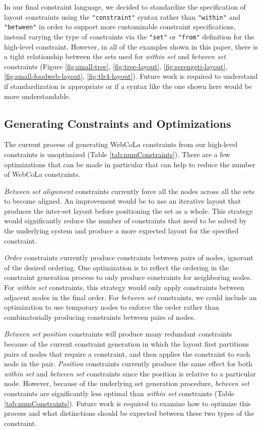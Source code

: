 In our final constraint language, we decided to standardize the specification of layout constraints using the \texttt{"constraint"} syntax rather than \texttt{"within"} and \texttt{"between"} in order to support more customizable constraint specifications, instead varying the type of constraints via the \texttt{"set"} or \texttt{"from"} definition for the high-level constraint. However, in all of the examples shown in this paper, there is a tight relationship between the sets used for \emph{within set} and \emph{between set} constraints (Figure \ref{fig:small-tree}, \ref{fig:tree-layout}, \ref{fig:serengeti-layout}, \ref{fig:small-foodweb-layout}, \ref{fig:tlr4-layout}). Future work is required to understand if standardization is appropriate or if a syntax like the one shown here would be more understandable.

\subsection{Generating Constraints and Optimizations}
The current process of generating WebCoLa constraints from our high-level constraints is unoptimized (Table \ref{tab:numConstraints}). There are a few optimizations that can be made in particular that can help to reduce the number of WebCoLa constraints.

\emph{Between set alignment} constraints currently force all the nodes across all the sets to become aligned. An improvement would be to use an iterative layout that produces the inter-set layout before positioning the set as a whole. This strategy would significantly reduce the number of constraints that need to be solved by the underlying system and produce a more expected layout for the specified constraint.

\emph{Order} constraints currently produce constraints between pairs of nodes, ignorant of the desired ordering. One optimization is to reflect the ordering in the constraint generation process to only produce constraints for neighboring nodes. For \emph{within set} constraints, this strategy would only apply constraints between adjacent nodes in the final order. For \emph{between set} constraints, we could include an optimization to use temporary nodes to enforce the order rather than combinatorially producing constraints between pairs of nodes.

\emph{Between set position} constraints will produce many redundant constraints because of the current constraint generation in which the layout first partitions pairs of nodes that require a constraint, and then applies the constraint to each node in the pair. \emph{Position} constraints currently produce the same effect for both \emph{within set} and \emph{between set} constraints since the position is relative to a particular node. However, because of the underlying set generation procedure, \emph{between set} constraints are significantly less optimal than \emph{within set} constraints (Table \ref{tab:numConstraints}). Future work is required to examine how to optimize this process and what distinctions should be expected between these two types of the constraint.
